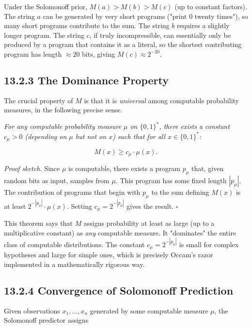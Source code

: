 Under the Solomonoff prior, $M(a) > M(b) > M(c)$ (up to constant factors). The string $a$ can be generated by very short programs ("print 0 twenty times"), so many short programs contribute to the sum. The string $b$ requires a slightly longer program. The string $c$, if truly incompressible, can essentially only be produced by a program that contains it as a literal, so the shortest contributing program has length $\approx 20$ bits, giving $M(c) \approx 2^{-20}$.

\subsection{13.2.3 The Dominance Property}

The crucial property of $M$ is that it is \textit{universal} among computable probability measures, in the following precise sense.

\begin{theorem}
\textit{For any computable probability measure $\mu$ on $\{ 0,1\} ^*$, there exists a constant $c_\mu > 0$ (depending on $\mu$ but not on $x$) such that for all $x \in \{ 0,1\} ^*$:}

\[
M(x) \geq c_\mu \cdot \mu(x).
\]

\textit{Proof sketch.} Since $\mu$ is computable, there exists a program $p_\mu$ that, given random bits as input, samples from $\mu$. This program has some fixed length $|p_\mu|$. The contribution of programs that begin with $p_\mu$ to the sum defining $M(x)$ is at least $2^{-|p_\mu|} \cdot \mu(x)$. Setting $c_\mu = 2^{-|p_\mu|}$ gives the result. $\square$

This theorem says that $M$ assigns probability at least as large (up to a multiplicative constant) as \textit{any} computable measure. It "dominates" the entire class of computable distributions. The constant $c_\mu = 2^{-|p_\mu|}$ is small for complex hypotheses and large for simple ones, which is precisely Occam's razor implemented in a mathematically rigorous way.
\end{theorem}

\subsection{13.2.4 Convergence of Solomonoff Prediction}

Given observations $x_1, \ldots, x_n$ generated by some computable measure $\mu$, the Solomonoff predictor assigns

